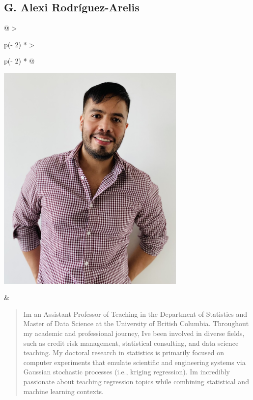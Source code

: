\documentclass[
  letterpaper,
  DIV=11,
  numbers=noendperiod]{scrreprt}
\begin{document}
\subsection*{G. Alexi
Rodríguez-Arelis}\label{g.-alexi-rodruxedguez-arelis}

\begin{longtable}[]{@{}
  >{\raggedright\arraybackslash}p{(\columnwidth - 2\tabcolsep) * }
  >{\raggedright\arraybackslash}p{(\columnwidth - 2\tabcolsep) * }@{}}
\toprule\noalign{}
\endhead
\bottomrule\noalign{}
\endlastfoot
\begin{minipage}[t]{\linewidth}\raggedright
\includegraphics[width=3.64583in,height=\textheight]{img/photo-alexi.jpg}
\end{minipage} & \begin{minipage}[t]{\linewidth}\raggedright
\begin{quote}
I\textquotesingle m an Assistant Professor of Teaching in the Department
of Statistics and Master of Data Science at the University of British
Columbia. Throughout my academic and professional journey,
I\textquotesingle ve been involved in diverse fields, such as credit
risk management, statistical consulting, and data science teaching. My
doctoral research in statistics is primarily focused on computer
experiments that emulate scientific and engineering systems via Gaussian
stochastic processes (i.e., kriging regression). I\textquotesingle m
incredibly passionate about teaching regression topics while combining
statistical and machine learning contexts.
\end{quote}
\end{minipage} \\
\end{longtable}
\end{document}
